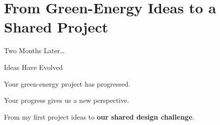 \begingroup
\date[19.10.2026]{19 October 2026}
\part[nopartpage]{From Green-Energy Ideas to a Shared Project}

\begin{frame}
\centering
\vfill
{\color{fh-ooe-red}\Huge Two Months Later\ldots\par}
\vspace{.7em}
{\color{fh-ooe-red}\Huge Ideas Have Evolved\par}
\vspace{1.5em}
{\Large Your green-energy project has progressed.\par}
\vspace{.5em}
{\Large Your progress gives us a new perspective.\par}
\vfill
{\large From my first project ideas to \textbf{our shared design challenge}.\par}
\vfill
\end{frame}
